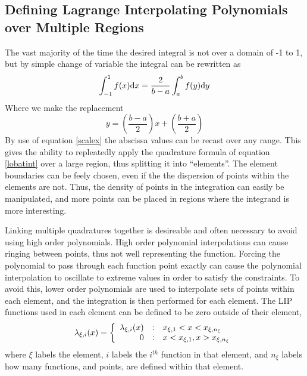 \documentclass[preprint]{revtex4}
\newcommand{\dx}{{\rm d}x}
\newcommand{\dy}{{\rm d}y}
\begin{document}
\subsection{Defining Lagrange Interpolating Polynomials over Multiple Regions}
The vast majority of the time the desired integral is not over a domain of -1 to 1, but
by simple change of variable the integral can be rewritten as
\begin{equation}
\label{scaleint}
\int_{-1}^{1}f(x)\dx = \frac{2}{b-a}\int_a^bf(y)\dy
\end{equation}
Where we make the replacement
\begin{equation}
\label{scalex}
y = \left(\frac{b-a}{2}\right)x+\left(\frac{b+a}{2}\right)
\end{equation}
By use of equation \ref{scalex} the abscissa values can be recast over any range. 
This gives the ability to repleatedly apply the quadrature formula of equation 
\ref{lobatint} over a large region, thus splitting it into ``elements''. The 
element boundaries can be feely chosen, even if the the dispersion of points within
the elements are not. Thus, the density of points in the integration can easily 
be manipulated, and more points can be placed in regions where the integrand is 
more interesting. 

Linking multiple quadratures together is desireable and often necessary to avoid
using high order polynomials. 
High order polynomial interpolations can cause ringing
between points, thus not well representing the function. Forcing the polynomial
to pass through each function point exactly can cause the polynomial interpolation
to oscillate to extreme values in order to satisfy the constraints. To avoid this, 
lower order polynomials are used to interpolate sets of points within each element, 
and the integration is then performed for each element. 
The LIP functions used in each 
element can be defined to be zero outside of their element, 
\begin{equation}
\label{lipdomain}
\lambda_{\xi,i}(x)=\left\{\begin{array}
    {r@{\quad:\quad}l}
    \lambda_{\xi,i}(x) & x_{\xi,1} < x < x_{\xi,n_\xi} \\
    0 & x < x_{\xi,1}, x> x_{\xi,n_\xi}
    \end{array} \right.
\end{equation}
where $\xi$ labels the element, $i$ labels the $i^{th}$ function in that
element, and $n_\xi$ labels how many functions, and points, are defined within
that element. 
\end{document}
